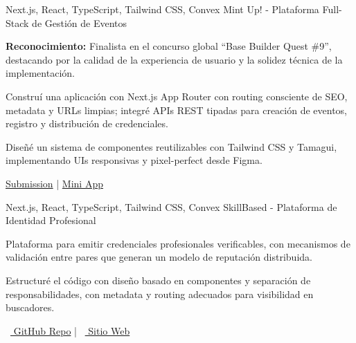 

\begin{cventries}

  \cventry
    {Next.js, React, TypeScript, Tailwind CSS, Convex} %
    {Mint Up! - Plataforma Full-Stack de Gestión de Eventos} %
    {} %
    {} %
    {
      \begin{cvitems} %
        \item {\textbf{Reconocimiento:} Finalista en el concurso global \textquotedblleft Base Builder Quest \#9\textquotedblright, destacando por la calidad de la experiencia de usuario y la solidez técnica de la implementación.}
        \item {Construí una aplicación con Next.js App Router con routing consciente de SEO, metadata y URLs limpias; integré APIs REST tipadas para creación de eventos, registro y distribución de credenciales.}
        \item {Diseñé un sistema de componentes reutilizables con Tailwind CSS y Tamagui, implementando UIs responsivas y pixel-perfect desde Figma.}
        \item {\faLink \href{https://devfolio.co/projects/mint-up-5d5d}{ Submission} \quad | \quad \faLink \href{https://farcaster.xyz/miniapps/jkuOonikCzn7/mint-up}{ Mini App}}
      \end{cvitems}
    }

  \vspace{6mm}

  \cventry
    {Next.js, React, TypeScript, Tailwind CSS, Convex} %
    {SkillBased - Plataforma de Identidad Profesional} %
    {} %
    {} %
    {
      \begin{cvitems} %
        \item {Plataforma para emitir credenciales profesionales verificables, con mecanismos de validación entre pares que generan un modelo de reputación distribuida.}
        \item {Estructuré el código con diseño basado en componentes y separación de responsabilidades, con metadata y routing adecuados para visibilidad en buscadores.}
        \item {\faGithub\ \href{https://github.com/mavix21/SkillBased}{ GitHub Repo} \quad | \quad \faLink\ \href{https://skill-based.vercel.app/}{ Sitio Web}}
      \end{cvitems}
    }


\end{cventries}
